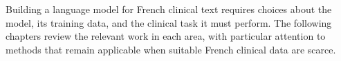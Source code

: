 
\begin{reviewrewrite}
Building a language model for French clinical text requires choices about the
model, its training data, and the clinical task it must perform. The following
chapters review the relevant work in each area, with particular attention to
methods that remain applicable when suitable French clinical data are scarce.
\end{reviewrewrite}







